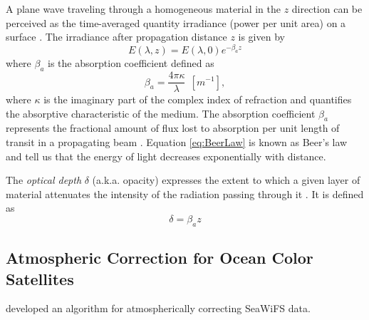 A plane wave traveling through a homogeneous material in the $z$ direction can be perceived as the time-averaged quantity irradiance   (power per unit area) on a surface \cite{Eismann2012}. The irradiance after propagation distance $z$ is given by
\begin{equation}
  \label{eq:BeerLaw}
  E(\lambda,z) = E(\lambda,0)e^{-\beta_a z}
\end{equation}
where $\beta_a$ is the absorption coefficient   defined as
\begin{equation}
  \beta_a = \frac{4\pi \kappa}{\lambda}~~[m^{-1}],
\end{equation}
where $\kappa$ is the imaginary part of the complex index of refraction and quantifies the absorptive characteristic of the medium. The absorption coefficient $\beta_a$ represents the fractional amount of flux lost to absorption per unit length of transit in a propagating beam \cite{Schott}. Equation \ref{eq:BeerLaw} is known as Beer's law  and tell us that the energy of light decreases exponentially with distance.

The {\it optical depth}   $\delta$ (a.k.a. opacity) expresses the extent to which a given layer of material attenuates the intensity of the radiation passing through it \cite{Rees1990}. It is defined as
\begin{equation}
    \delta = \beta_{a}z
\end{equation}


\subsection{ Atmospheric Correction for Ocean Color Satellites }
\cite{Gordon:1994} developed an algorithm for atmospherically correcting SeaWiFS data.

